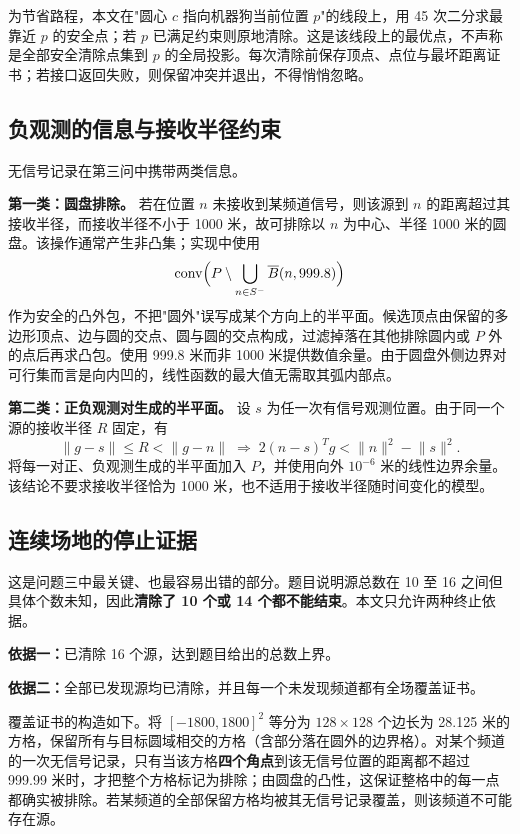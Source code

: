 为节省路程，本文在"圆心 $c$ 指向机器狗当前位置 $p$"的线段上，用 45 次二分求最靠近 $p$ 的安全点；若 $p$ 已满足约束则原地清除。这是该线段上的最优点，不声称是全部安全清除点集到 $p$ 的全局投影。每次清除前保存顶点、点位与最坏距离证书；若接口返回失败，则保留冲突并退出，不得悄悄忽略。

\subsection{负观测的信息与接收半径约束}

无信号记录在第三问中携带两类信息。

\textbf{第一类：圆盘排除。} 若在位置 $n$ 未接收到某频道信号，则该源到 $n$ 的距离超过其接收半径，而接收半径不小于 1000 米，故可排除以 $n$ 为中心、半径 1000 米的圆盘。该操作通常产生非凸集；实现中使用
\begin{equation}
  \operatorname{conv}\Bigl(P\setminus\bigcup_{n\in S^-}\overline{B}(n,999.8)\Bigr)
  \label{eq:disk-exclusion}
\end{equation}
作为安全的凸外包，不把"圆外"误写成某个方向上的半平面。候选顶点由保留的多边形顶点、边与圆的交点、圆与圆的交点构成，过滤掉落在其他排除圆内或 $P$ 外的点后再求凸包。使用 999.8 米而非 1000 米提供数值余量。由于圆盘外侧边界对可行集而言是向内凹的，线性函数的最大值无需取其弧内部点。

\textbf{第二类：正负观测对生成的半平面。} 设 $s$ 为任一次有信号观测位置。由于同一个源的接收半径 $R$ 固定，有
\begin{equation}
  \lVert g-s\rVert\le R<\lVert g-n\rVert
  \;\Longrightarrow\;
  2(n-s)^{T}g<\lVert n\rVert^2-\lVert s\rVert^2 .
  \label{eq:pos-neg-halfplane}
\end{equation}
将每一对正、负观测生成的半平面加入 $P$，并使用向外 $10^{-6}$ 米的线性边界余量。该结论不要求接收半径恰为 1000 米，也不适用于接收半径随时间变化的模型。

\subsection{连续场地的停止证据}
\label{sec:coverage}

这是问题三中最关键、也最容易出错的部分。题目说明源总数在 10 至 16 之间但具体个数未知，因此\textbf{清除了 10 个或 14 个都不能结束}。本文只允许两种终止依据。

\textbf{依据一：}已清除 16 个源，达到题目给出的总数上界。

\textbf{依据二：}全部已发现源均已清除，并且每一个未发现频道都有全场覆盖证书。

覆盖证书的构造如下。将 $[-1800,1800]^2$ 等分为 $128\times128$ 个边长为 28.125 米的方格，保留所有与目标圆域相交的方格（含部分落在圆外的边界格）。对某个频道的一次无信号记录，只有当该方格\textbf{四个角点}到该无信号位置的距离都不超过 999.99 米时，才把整个方格标记为排除；由圆盘的凸性，这保证整格中的每一点都确实被排除。若某频道的全部保留方格均被其无信号记录覆盖，则该频道不可能存在源。

